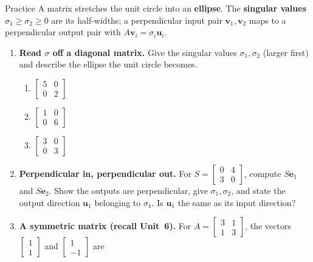 \documentclass[10pt]{article}
\newcommand{\uu}{\mathbf{u}}
\newcommand{\vv}{\mathbf{v}}
\newcommand{\ee}{\mathbf{e}}
\begin{document}
\namedateperiod

\vspace{0.12in}

\begin{notesbox}{Practice}
A matrix stretches the unit circle into an \textbf{ellipse}. The \textbf{singular values}
$\sigma_1\ge\sigma_2\ge0$ are its half-widths; a perpendicular input pair $\vv_1,\vv_2$ maps to a
perpendicular output pair with $A\vv_i=\sigma_i\uu_i$.

\begin{enumerate}[leftmargin=1.9em, itemsep=12pt]
  \item \textbf{Read $\sigma$ off a diagonal matrix.} Give the singular values $\sigma_1,\sigma_2$
        (larger first) and describe the ellipse the unit circle becomes.
    \begin{enumerate}[label=(\alph*), leftmargin=1.8em, itemsep=4pt]
      \item $\begin{bmatrix} 5 & 0 \\ 0 & 2 \end{bmatrix}$ \hfill
      \item $\begin{bmatrix} 1 & 0 \\ 0 & 6 \end{bmatrix}$ \hfill
      \item $\begin{bmatrix} 3 & 0 \\ 0 & 3 \end{bmatrix}$
    \end{enumerate}
    \vspace{1.1cm}
  \item \textbf{Perpendicular in, perpendicular out.} For $S=\begin{bmatrix} 0 & 4 \\ 3 & 0 \end{bmatrix}$,
        compute $S\ee_1$ and $S\ee_2$. Show the outputs are perpendicular, give $\sigma_1,\sigma_2$, and
        state the output direction $\uu_1$ belonging to $\sigma_1$. Is $\uu_1$ the same as its input
        direction? 
  \item \textbf{A symmetric matrix (recall Unit~6).} For $A=\begin{bmatrix} 3 & 1 \\ 1 & 3 \end{bmatrix}$,
        the vectors $\begin{bmatrix} 1 \\ 1 \end{bmatrix}$ and $\begin{bmatrix} 1 \\ -1 \end{bmatrix}$ are

\end{enumerate}
\end{notesbox}
\end{document}

